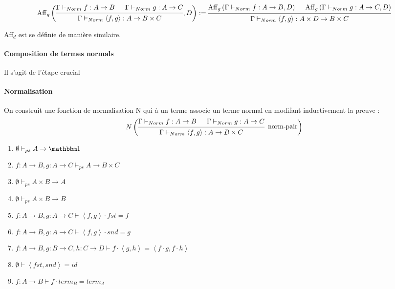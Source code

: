 \documentclass[12pt']{article}
\begin{document}
\begin{equation}
	\mathrm{Aff}_g \left(
	\begin{prooftree}
		\hypo[]{\Gamma \vdash_{Norm} f : A \rightarrow B}
		\hypo[]{\Gamma \vdash_{Norm} g : A \rightarrow C}
		\infer2[]{\Gamma \vdash_{Norm} \left<f, g\right> : A \rightarrow B \times C}
	\end{prooftree}
	, D
	\right)
	:=
	\begin{prooftree}
		\hypo[]{\mathrm{Aff}_g \left( \Gamma \vdash_{Norm} f : A \rightarrow B , D \right)}
		\hypo[]{\mathrm{Aff}_g \left( \Gamma \vdash_{Norm} g : A \rightarrow C , D \right)}
		\infer2[]{\Gamma \vdash_{Norm} \left<f, g\right> : A \times D \rightarrow B \times C}
	\end{prooftree}
\end{equation}

$\mathrm{Aff}_d$ est se définie de manière similaire.

\paragraph{Composition de termes normals} Il s'agit de l'étape crucial 


\paragraph{Normalisation} On construit une fonction de normalisation N qui à un terme associe un terme normal en modifant inductivement la preuve : 
\begin{equation}
	N\left( 
	\begin{prooftree}
		\hypo[]{\Gamma \vdash_{Norm} f : A \rightarrow B}
		\hypo[]{\Gamma \vdash_{Norm} g : A \rightarrow C}
		\infer2[norm-pair]{\Gamma \vdash_{Norm} \left<f, g\right> : A \rightarrow B \times C}
	\end{prooftree}
	\right)
\end{equation}
	

\begin{enumerate}
	\item $\emptyset \vdash_{ps} A \rightarrow \mathbbm 1$
	\item $f : A \rightarrow B, g : A \rightarrow C \vdash_{ps} A \rightarrow B \times C$
	\item $\emptyset \vdash_{ps} A \times B \rightarrow A$
	\item $\emptyset \vdash_{ps} A \times B \rightarrow B$
	
	\item $f : A \rightarrow B, g : A \rightarrow C \vdash \left<f, g\right> \cdot fst = f$
	\item $f : A \rightarrow B, g : A \rightarrow C \vdash \left<f, g\right> \cdot snd = g$
	\item $f : A \rightarrow B, g : B \rightarrow C, h : C \rightarrow D \vdash f \cdot \left<g, h\right> = \left< f \cdot g, f \cdot h\right>$
	\item $\emptyset \vdash \left<fst, snd\right> = id$
	\item $f : A \rightarrow B \vdash f \cdot term_B = term_A$
\end{enumerate}
\end{document}

